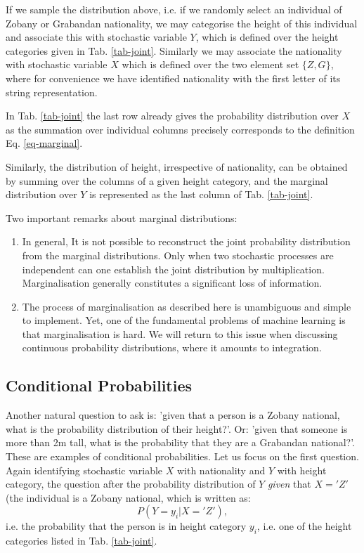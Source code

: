     If we sample the distribution above, i.e. if we randomly select an individual
    of Zobany or Grabandan nationality, we may categorise the height of this individual
    and associate this with stochastic variable $Y$, which is defined over the
    height categories given in Tab. \ref{tab-joint}. Similarly we may associate
    the nationality with stochastic variable $X$ which is defined over the
    two element set $\{ Z, G \}$, where for convenience we have identified nationality
    with the first letter of its string representation.

    In Tab. \ref{tab-joint} the last row already gives the probability distribution
    over $X$ as the summation over individual columns precisely corresponds
    to the definition Eq. \ref{eq-marginal}.

    Similarly, the distribution of height, irrespective of nationality, can be obtained
    by summing over the columns of a given height category, and the marginal
    distribution over $Y$ is represented as the last column of Tab. \ref{tab-joint}.

    Two important remarks about marginal distributions:
    \begin{enumerate}
    \item In general, It is not possible to reconstruct the joint probability distribution from the
      marginal distributions. Only when two stochastic processes are independent can one establish the
      joint distribution by multiplication. Marginalisation generally constitutes a significant loss of information.

    \item The process of marginalisation as described here is unambiguous and simple to implement. Yet, one of the
      fundamental problems of machine learning is that marginalisation is hard. We will return to this issue when discussing
      continuous probability distributions, where it amounts to integration.
      
    \end{enumerate}
    
  \subsection{Conditional Probabilities}  
  Another natural question to ask is: 'given that a person is a Zobany national, what is the probability
  distribution of their height?'. Or: 'given that someone is more than 2m tall, what is the probability
  that they are a Grabandan national?'. These are examples of conditional probabilities. Let us focus
  on the first question. Again identifying stochastic variable $X$ with nationality and $Y$ with height
  category, the question after the probability distribution of $Y$ \emph{given} that $X = 'Z'$ (the individual
  is a Zobany national, which is written as:
  $$
  P(Y = y_i | X = 'Z'),
  $$
  i.e. the probability that the person is in height category $y_i$, i.e. one of the height categories
  listed in Tab. \ref{tab-joint}.

